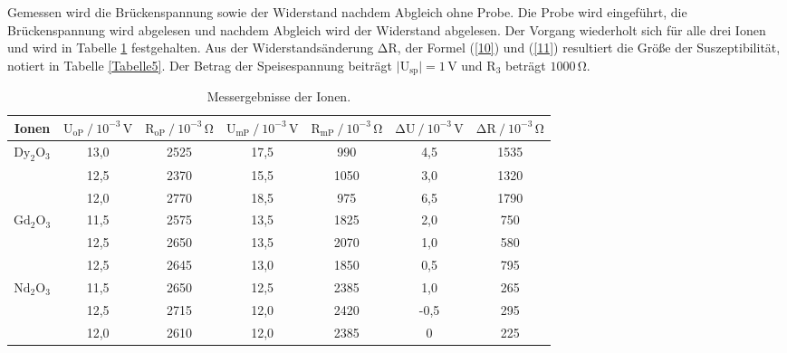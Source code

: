 \begin{flushleft}
    Gemessen wird die Brückenspannung sowie der Widerstand nachdem Abgleich ohne Probe.
    Die Probe wird eingeführt, die Brückenspannung wird abgelesen und nachdem Abgleich wird der Widerstand abgelesen.
    Der Vorgang wiederholt sich für alle drei Ionen und wird in Tabelle \ref{Tabelle3} festgehalten. 
    Aus der Widerstandsänderung $\increment\text{R}$, der Formel (\ref{10}) und (\ref{11}) resultiert die Größe der Suszeptibilität, notiert in Tabelle \ref{Tabelle5}. 
    Der Betrag der Speisespannung beiträgt $\lvert \text{U}_{\text{sp}} \rvert = 1\,\unit{\volt}$ und $\text{R}_{3}$ beträgt $1000\,\unit{\ohm}$.
\end{flushleft}

\begin{table}[H]
    \centering
    \caption{Messergebnisse der Ionen.} 
    \label{Tabelle3}
    \begin{tabular} {c || c  c  c  c  c  c}
        \toprule
        {Ionen} &
        {$ \text{U}_{\text{oP}} \mathbin{/} 10^{-3}\,\unit{\volt} $} &
        {$ \text{R}_{\text{oP}} \mathbin{/} 10^{-3}\,\unit{\ohm} $} &
        {$ \text{U}_{\text{mP}} \mathbin{/} 10^{-3}\,\unit{\volt} $} &
        {$ \text{R}_{\text{mP}} \mathbin{/} 10^{-3}\,\unit{\ohm} $} &
        {$ \increment\text{U} \mathbin{/} 10^{-3}\,\unit{\volt} $} &
        {$ \increment\text{R} \mathbin{/} 10^{-3}\,\unit{\ohm} $}  \\
        \midrule
        \underline{$\text{Dy}_{2}\text{O}_{3}$} & 13,0 & 2525 & 17,5 & 990  & 4,5 & 1535 \\
                                                & 12,5 & 2370 & 15,5 & 1050 & 3,0 & 1320 \\
                                                & 12,0 & 2770 & 18,5 & 975  & 6,5 & 1790 \\
        \hline
        \underline{$\text{Gd}_{2}\text{O}_{3}$} & 11,5 & 2575 & 13,5 & 1825 & 2,0 & 750 \\
                                                & 12,5 & 2650 & 13,5 & 2070 & 1,0 & 580 \\
                                                & 12,5 & 2645 & 13,0 & 1850 & 0,5 & 795 \\
        \hline
        \underline{$\text{Nd}_{2}\text{O}_{3}$} & 11,5 & 2650 & 12,5 & 2385 & 1,0  & 265 \\
                                                & 12,5 & 2715 & 12,0 & 2420 & -0,5 & 295 \\
                                                & 12,0 & 2610 & 12,0 & 2385 & 0    & 225 \\
        \bottomrule
    \end{tabular} 
\end{table}

